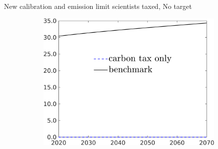 \documentclass[11pt,aspectratio=169]{beamer}
\begin{document}
\begin{frame}{New calibration and emission limit scientists taxed, No target}
\begin{figure}[h!!]
\begin{subfigure}{0.4\textwidth}
			\includegraphics[width=1\textwidth]{../codding_model/own_basedOnFried/optimalPol_010922_revision/figures/all_13Sept22/NewCalib_pol_NoT_dTaulAvS_emnet1_Sun2_spillover0_knspil3_xgr0_nsk0_sep0_extern0_PV1_etaa0.79_lgd1.png}
		\end{subfigure}
	\end{figure}
\end{frame}
\end{document}
